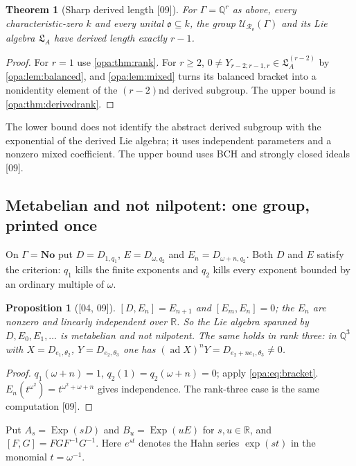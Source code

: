 \documentclass[11pt,oneside]{article}
\numberwithin{equation}{section}
\newtheorem{theorem}{Theorem}[section]
\newtheorem{proposition}[proposition]{Proposition}
\theoremstyle{definition}
\theoremstyle{remark}
\newcommand{\No}{\mathbf{No}}
\newcommand{\R}{\mathbb R}
\newcommand{\Q}{\mathbb Q}
\newcommand{\oo}{\mathfrak o}
\newcommand{\Ro}{\mathcal R_{\oo}}
\newcommand{\LL}{\mathfrak L}
\newcommand{\UU}{\mathcal U}
\newcommand{\Exp}{\operatorname{Exp}}
\newcommand{\ad}{\operatorname{ad}}
\newcommand{\src}[1]{\textup{\textsf{\small[#1]}}}
\begin{document}
\begin{theorem}[Sharp derived length \src{09}]\label{opa:thm:sharp}
For $\Gamma=\Q^r$ as above, every characteristic-zero $k$ and every unital
$\oo\subseteq k$, the group $\UU_{\Ro}(\Gamma)$ and its Lie algebra $\LL_A$ have
derived length exactly $r-1$.
\end{theorem}
\begin{proof}
For $r=1$ use \cref{opa:thm:rank}. For $r\ge2$,
$0\ne Y_{r-2;r-1,r}\in\LL_A^{(r-2)}$ by \cref{opa:lem:balanced}, and
\cref{opa:lem:mixed} turns its balanced bracket into a nonidentity element of the
$(r-2)$nd derived subgroup. The upper bound is \cref{opa:thm:derivedrank}.
\end{proof}

The lower bound does not identify the abstract derived subgroup with the
exponential of the derived Lie algebra; it uses independent parameters and a
nonzero mixed coefficient. The upper bound uses BCH and strongly closed ideals
\src{09}.

\subsection{Metabelian and not nilpotent: one group, printed once}

On $\Gamma=\No$ put $D=D_{1,q_1}$, $E=D_{\omega,q_2}$ and $E_n=D_{\omega+n,q_2}$. Both
$D$ and $E$ satisfy the criterion: $q_1$ kills the finite exponents and $q_2$
kills every exponent bounded by an ordinary multiple of $\omega$.

\begin{proposition}[\src{04, 09}]\label{opa:prop:lienilp}
$[D,E_n]=E_{n+1}$ and $[E_m,E_n]=0$; the $E_n$ are nonzero and linearly
independent over $\R$. So the Lie algebra spanned by $D,E_0,E_1,\ldots$ is
metabelian and not nilpotent. The same holds in rank three: in $\Q^3$ with
$X=D_{e_1,\theta_2}$, $Y=D_{e_2,\theta_3}$ one has $(\ad X)^nY=D_{e_2+ne_1,\theta_3}\ne0$.
\end{proposition}
\begin{proof}
$q_1(\omega+n)=1$, $q_2(1)=q_2(\omega+n)=0$; apply \eqref{opa:eq:bracket}.
$E_n(t^{\omega^2})=t^{\omega^2+\omega+n}$ gives independence. The rank-three case is
the same computation \src{09}.
\end{proof}

Put $A_s=\Exp(sD)$ and $B_u=\Exp(uE)$ for $s,u\in\R$, and $[F,G]=FGF^{-1}G^{-1}$.
Here $e^{st}$ denotes the Hahn series $\exp(st)$ in the monomial $t=\omega^{-1}$.
\end{document}
